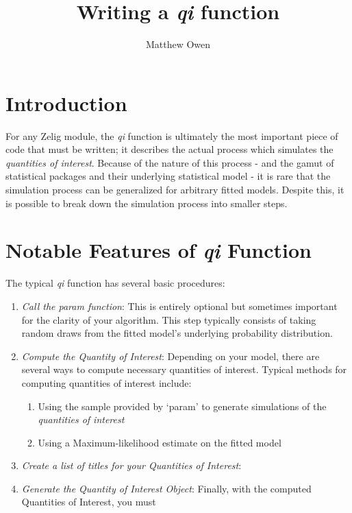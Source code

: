 \documentclass[10pt]{article}
\begin{document}
\title{Writing a \emph{qi} function}
\author{Matthew Owen}
\maketitle

\section{Introduction}

For any Zelig module, the \emph{qi} function is ultimately the most
important piece of code that must be written; it describes the actual
process which simulates the \emph{quantities of interest}.  Because of
the nature of this process - and the gamut of statistical packages and
their underlying statistical model - it is rare that the simulation
process can be generalized for arbitrary fitted models.  Despite this,
it is possible to break down the simulation process into smaller steps.


%
%
\section{Notable Features of \emph{qi} Function}

The typical \emph{qi} function has several basic procedures:

\begin{enumerate}

	\item \emph{Call the param function}:  This is entirely optional but
		sometimes important for the clarity of your algorithm.  This step
		typically consists of taking random draws from the fitted model's
		underlying probability distribution.
		
	\item \emph{Compute the Quantity of Interest}: Depending on your model,
		there are several ways to compute necessary quantities of interest.
		Typical methods for computing quantities of interest include:
		\begin{enumerate}
			
			\item Using the sample provided by `param' to generate simulations
				of the \emph{quantities of interest}
			
			\item Using a Maximum-likelihood estimate on the fitted model
			
		\end{enumerate}
		
	\item \emph{Create a list of titles for your Quantities of Interest}: 
	
	\item \emph{Generate the Quantity of Interest Object}: Finally, with the
		computed Quantities of Interest, you must
		
\end{enumerate}
\end{document}
